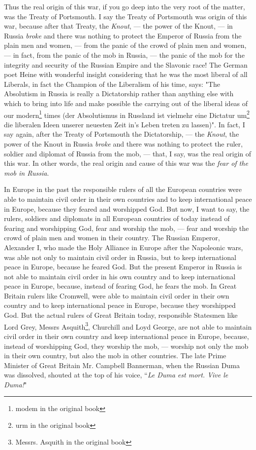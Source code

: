 Thus the real origin of this war, if you go deep into the very root of the matter, was the Treaty of Portsmouth.
I say the Treaty of Portsmouth was origin of this war, because after that Treaty, the \emph{Knout}, --- the power of the Knout, --- in Russia \emph{broke} and there was nothing to protect the Emperor of Russia from the plain men and women, --- from the panic of the crowd of plain men and women, --- in fact, from the panic of the mob in Russia, --- the panic of the mob for the integrity and security of the Russian Empire and the Slavonic race!
The German poet Heine with wonderful insight considering that he was the most liberal of all Liberals, in fact the Champion of the Liberalism of his time, says: "The Absolutism in Russia is really a Dictatorship rather than anything else with which to bring into life and make possible the carrying out of the liberal ideas of our modern\footnote{modem in the original book} times (der Absolutismus in Russland ist vielmehr eine Dictatur um\footnote{urm in the original book} die liberalen Ideen unserer neuesten Zeit in's Leben treten zu lassen)".
In fact, I say again, after the Treaty of Portsmouth the Dictatorship, --- the \emph{Knout}, the power of the Knout in Russia \emph{broke} and there was nothing to protect the ruler, soldier and diplomat of Russia from the mob, --- that, I say, was the real origin of this war.
In other words, the real origin and cause of this war was the \emph{fear of the mob in Russia}.

In Europe in the past the responsible rulers of all the European countries were able to maintain civil order in their own countries and to keep international peace in Europe, because they feared and worshipped God.
But now, I want to say, the rulers, soldiers and diplomats in all European countries of today instead of fearing and worshipping God, fear and worship the mob, --- fear and worship the crowd of plain men and women in their country.
The Russian Emperor, Alexander I, who made the Holy Alliance in Europe after the Napoleonic wars, was able not only to maintain civil order in Russia, but to keep international peace in Europe, because he feared God.
But the present Emperor in Russia is not able to maintain civil order in his own country and to keep international peace in Europe, because, instead of fearing God, he fears the mob.
In Great Britain rulers like Cromwell, were able to maintain civil order in their own country and to keep international peace in Europe, because they worshipped God.
But the actual rulers of Great Britain today, responsible Statesmen like Lord Grey, Messrs Asquith\footnote{Messrs. Asquith in the original book}, Churchill and Loyd George, are not able to maintain civil order in their own country and keep international peace in Europe, because, instead of worshipping God, they worship the mob, --- worship not only the mob in their own country, but also the mob in other countries.
The late Prime Minister of Great Britain Mr. Campbell Bannerman, when the Russian Duma was dissolved, shouted at the top of his voice, ``\emph{Le Duma est mort. Vive le Duma!}"

